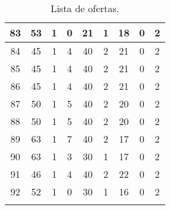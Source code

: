 \begin{apendices}
{\begin{longtable}{|c|c|c|c|c|c|c|c|c|}
83 & 53 & 1 & 0 & 21 & 1 & 18 & 0 & 2 \\ \hline
84 & 45 & 1 & 4 & 40 & 2 & 21 & 0 & 2 \\ \hline
85 & 45 & 1 & 4 & 40 & 2 & 21 & 0 & 2 \\ \hline
86 & 45 & 1 & 4 & 40 & 2 & 21 & 0 & 2 \\ \hline
87 & 50 & 1 & 5 & 40 & 2 & 20 & 0 & 2 \\ \hline
88 & 50 & 1 & 5 & 40 & 2 & 20 & 0 & 2 \\ \hline
89 & 63 & 1 & 7 & 40 & 2 & 17 & 0 & 2 \\ \hline
90 & 63 & 1 & 3 & 30 & 1 & 17 & 0 & 2 \\ \hline
91 & 46 & 1 & 4 & 40 & 2 & 22 & 0 & 2 \\ \hline
92 & 52 & 1 & 0 & 30 & 1 & 16 & 0 & 2 \\ \hline
\caption{Lista de ofertas.\label{ap-lista-ofertas}}
\end{longtable}
}




\end{apendices}
